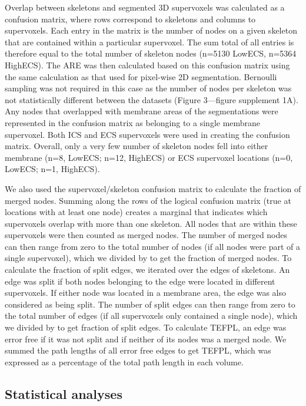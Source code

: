 \documentclass{article}
\begin{document}
Overlap between skeletons and segmented 3D supervoxels was calculated as a confusion matrix, where rows correspond to skeletons and columns to supervoxels. Each entry in the matrix is the number of nodes on a given skeleton that are contained within a particular supervoxel. The sum total of all entries is therefore equal to the total number of skeleton nodes (n=5130 LowECS, n=5364 HighECS). The ARE was then calculated based on this confusion matrix using the same calculation as that used for pixel-wise 2D segmentation. Bernoulli sampling was not required in this case as the number of nodes per skeleton was not statistically different between the datasets (Figure 3—figure supplement 1A). Any nodes that overlapped with membrane areas of the segmentations were represented in the confusion matrix as belonging to a single membrane supervoxel. Both ICS and ECS supervoxels were used in creating the confusion matrix. Overall, only a very few number of skeleton nodes fell into either membrane (n=8, LowECS; n=12, HighECS) or ECS supervoxel locations (n=0, LowECS; n=1, HighECS).

We also used the supervoxel/skeleton confusion matrix to calculate the fraction of merged nodes. Summing along the rows of the logical confusion matrix (true at locations with at least one node) creates a marginal that indicates which supervoxels overlap with more than one skeleton. All nodes that are within these supervoxels were then counted as merged nodes. The number of merged nodes can then range from zero to the total number of nodes (if all nodes were part of a single supervoxel), which we divided by to get the fraction of merged nodes. To calculate the fraction of split edges, we iterated over the edges of skeletons. An edge was split if both nodes belonging to the edge were located in different supervoxels. If either node was located in a membrane area, the edge was also considered as being split. The number of split edges can then range from zero to the total number of edges (if all supervoxels only contained a single node), which we divided by to get fraction of split edges. To calculate TEFPL, an edge was error free if it was not split and if neither of its nodes was a merged node. We summed the path lengths of all error free edges to get TEFPL, which was expressed as a percentage of the total path length in each volume.

\subsection*{Statistical analyses}
\end{document}
